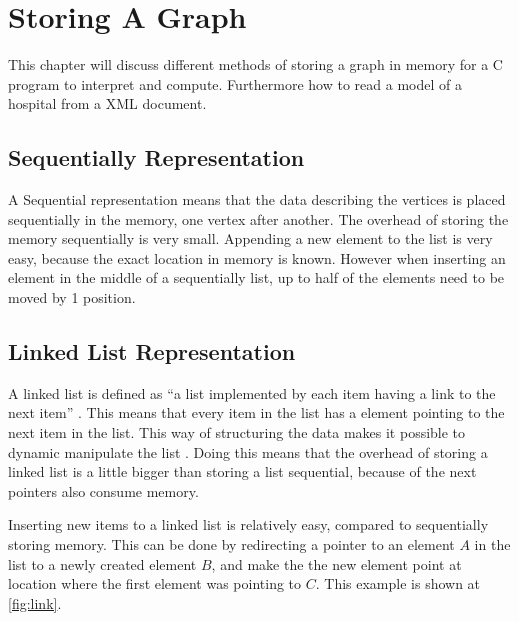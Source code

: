 \section{Storing A Graph}

This chapter will discuss different methods of storing a graph in memory for a C program to interpret and compute. Furthermore how to read a model of a hospital from a XML document.

\subsection{Sequentially Representation}
A Sequential representation means that the data describing the vertices is placed sequentially in the memory, one vertex after another. The overhead of storing the memory sequentially is very small. Appending a new element to the list is very easy, because the exact location in memory is known. However when inserting an element in the middle of a sequentially list, up to half of the elements need to be moved by 1 position. 





\subsection{Linked List Representation}
\label{sub:list}
A linked list is defined as \enquote{a list implemented by each item having a link to the next item} \cite{linked_list_def}. This means that every item in the list has a element pointing to the next item in the list. This way of structuring the data makes it possible to dynamic manipulate the list \cite{Linked_List}.  Doing this means that the overhead of storing a linked list is a little bigger than storing a list sequential, because of the next pointers also consume memory. 

Inserting new items to a linked list is relatively easy, compared to sequentially storing memory. This can be done by redirecting a pointer to an element $A$ in the list to a newly created element $B$, and make the the new element point at location where the first element was pointing to $C$. This example is shown at \cref{fig:link}.

